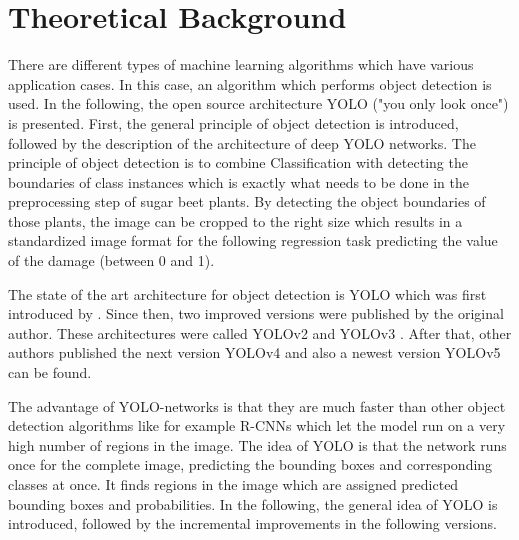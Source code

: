 
\chapter{Theoretical Background}

There are different types of machine learning algorithms which have various application cases. In this case, an algorithm which performs object detection is used. In the following, the open source architecture YOLO ("you only look once") is presented. First, the general principle of object detection is introduced, followed by the description of the architecture of deep YOLO networks. The principle of object detection is to combine Classification with detecting the boundaries of class instances which is exactly what needs to be done in the preprocessing step of sugar beet plants. By detecting the object boundaries of those plants, the image can be cropped to the right size which results in a standardized image format for the following regression task predicting the value of the damage (between 0 and 1).

The state of the art architecture for object detection is YOLO which was first introduced by \cite{yolov1}. Since then, two improved versions were published by the original author. These architectures were called YOLOv2 \cite{yolov2} and YOLOv3 \cite{yolov3}. After that, other authors published the next version YOLOv4 \cite{yolov4} and also a newest version YOLOv5 can be found. 

The advantage of YOLO-networks is that they are much faster than other object detection algorithms like for example R-CNNs \cite{RCNN} which let the model run on a very high number of regions in the image. The idea of YOLO is that the network runs once for the complete image, predicting the bounding boxes and corresponding classes at once. It finds regions in the image which are assigned predicted bounding boxes and probabilities. In the following, the general idea of YOLO is introduced, followed by the incremental improvements in the following versions. 

